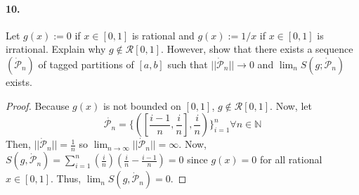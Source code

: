 \documentclass[12pt]{article}
\theoremstyle{remark}
\begin{document}
\paragraph{10.} Let $g(x):=0$ if $x \in[0,1]$ is rational and $g(x):=1 / x$ if $x \in[0,1]$ is irrational. Explain why $g \notin \mathcal{R}[0,1]$. However, show that there exists a sequence $(\dot{\mathcal{P}}_n)$ of tagged partitions of $[a, b]$ such that $||\dot{\mathcal{P}}_n|| \rightarrow 0$ and $\lim_n S(g ; \dot{\mathcal{P}}_n)$ exists.
\begin{proof}
    Because $g(x)$ is not bounded on $[0, 1]$, $g \notin \mathcal{R}[0, 1]$. Now, let $$\dot{\mathcal{P}_n} = \{([\frac{i - 1}{n}, \frac{i}{n}], \frac{i}{n})\}_{i = 1}^n \forall n \in \mathbb{N}$$ Then, $||\dot{\mathcal{P}}_n|| = \frac{1}{n}$ so $\lim_{n \to \infty} ||\dot{\mathcal{P}}_n|| = \infty$. Now, $S(g, \dot{\mathcal{P}}_n) = \sum_{i = 1}^n \left(\frac{i}{n}\right) \left(\frac{i}{n} - \frac{i - 1}{n}\right) = 0$ since $g(x) = 0$ for all rational $x \in[0, 1]$. Thus, $\lim_n S(g, \dot{\mathcal{P}}_n) = 0$.
\end{proof}
\end{document}
